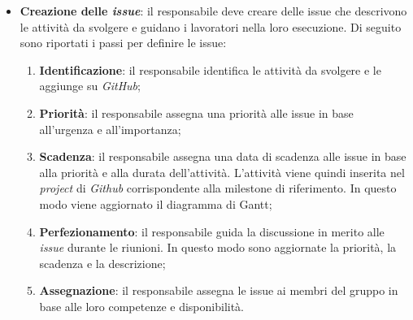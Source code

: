 \begin{itemize}
	\item \textbf{Creazione delle \textit{issue}}: il responsabile deve creare
	      delle issue che descrivono le attività da svolgere e guidano i
	      lavoratori nella loro esecuzione. Di seguito sono riportati i passi
	      per definire le issue:
	      \begin{enumerate}
		      \item \textbf{Identificazione}: il responsabile identifica le
		            attività da svolgere e le aggiunge su \textit{GitHub};

		      \item \textbf{Priorità}: il responsabile assegna una priorità
		            alle issue in base all'urgenza e all'importanza;

		      \item \textbf{Scadenza}: il responsabile assegna una data di
		            scadenza alle issue in base alla priorità e alla durata
		            dell'attività. L'attività viene quindi inserita nel
		            \textit{project} di \textit{Github} corrispondente alla
		            milestone di riferimento. In questo modo viene aggiornato il
		            diagramma di Gantt;

		      \item \textbf{Perfezionamento}: il responsabile guida la
		            discussione in merito alle \textit{issue} durante le
		            riunioni. In questo modo sono aggiornate la priorità, la
		            scadenza e la descrizione;

		      \item \textbf{Assegnazione}: il responsabile assegna le issue
		            ai membri del gruppo in base alle loro competenze e
		            disponibilità.
	      \end{enumerate}
\end{itemize}

